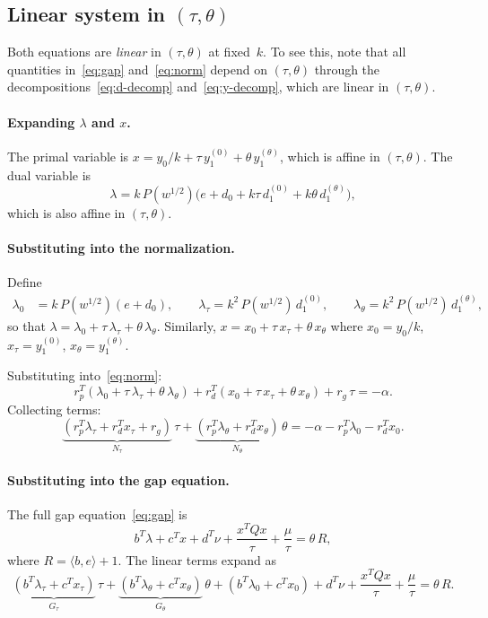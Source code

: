\documentclass{article}
\begin{document}
\subsection{Linear system in $(\tau, \theta)$}

Both equations are \emph{linear} in $(\tau, \theta)$ at fixed~$k$.
To see this, note that all quantities in~\eqref{eq:gap} and~\eqref{eq:norm}
depend on $(\tau, \theta)$ through the decompositions~\eqref{eq:d-decomp}
and~\eqref{eq:y-decomp}, which are linear in $(\tau, \theta)$.

\paragraph{Expanding $\lambda$ and $x$.}
The primal variable is $x = y_0/k + \tau\,y_1^{(0)} + \theta\,y_1^{(\theta)}$,
which is affine in $(\tau, \theta)$.
The dual variable is
\[
  \lambda = k\,P(w^{1/2})\bigl(e + d_0 + k\tau\,d_1^{(0)} + k\theta\,d_1^{(\theta)}\bigr),
\]
which is also affine in $(\tau, \theta)$.

\paragraph{Substituting into the normalization.}
Define
\begin{align*}
  \lambda_0 &= k\,P(w^{1/2})(e + d_0), \qquad
  \lambda_\tau = k^2\,P(w^{1/2})\,d_1^{(0)}, \qquad
  \lambda_\theta = k^2\,P(w^{1/2})\,d_1^{(\theta)},
\end{align*}
so that $\lambda = \lambda_0 + \tau\,\lambda_\tau + \theta\,\lambda_\theta$.
Similarly, $x = x_0 + \tau\,x_\tau + \theta\,x_\theta$ where
$x_0 = y_0/k$, $x_\tau = y_1^{(0)}$, $x_\theta = y_1^{(\theta)}$.

Substituting into~\eqref{eq:norm}:
\[
  r_p^T(\lambda_0 + \tau\,\lambda_\tau + \theta\,\lambda_\theta)
  + r_d^T(x_0 + \tau\,x_\tau + \theta\,x_\theta)
  + r_g\,\tau = -\alpha.
\]
Collecting terms:
\begin{equation} \label{eq:norm-linear}
  \underbrace{(r_p^T\lambda_\tau + r_d^T x_\tau + r_g)}_{N_\tau}\,\tau
  + \underbrace{(r_p^T\lambda_\theta + r_d^T x_\theta)}_{N_\theta}\,\theta
  = -\alpha - r_p^T\lambda_0 - r_d^T x_0.
\end{equation}

\paragraph{Substituting into the gap equation.}
The full gap equation~\eqref{eq:gap} is
\[
  b^T\lambda + c^T x + d^T\nu + \frac{x^T Q x}{\tau} + \frac{\mu}{\tau}
  = \theta\,R,
\]
where $R = \langle b,e\rangle + 1$.  The linear terms expand as
\begin{equation} \label{eq:gap-expanded}
  \underbrace{(b^T\lambda_\tau + c^T x_\tau)}_{G_\tau}\,\tau
  + \underbrace{(b^T\lambda_\theta + c^T x_\theta)}_{G_\theta}\,\theta
  + (b^T\lambda_0 + c^T x_0)
  + d^T\nu
  + \frac{x^T Q x}{\tau} + \frac{\mu}{\tau}
  = \theta\,R.
\end{equation}
\end{document}
